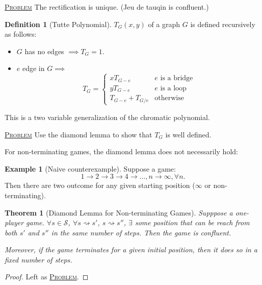 \documentclass{report}
\newcommand{\fancyem}[1]{\underline{\textsc{#1}}}
\newtheorem{theorem}{Theorem}[section]
\theoremstyle{definition}
\newtheorem{definition}{Definition}[section]
\newtheorem{example}{Example}[section]
\theoremstyle{remark}
\numberwithin{equation}{section}
\begin{document}
\fancyem{Problem} The rectification is unique. (Jeu de tauqin is confluent.)

\begin{definition}[Tutte Polynomial]
    $T_G(x, y)$ of a graph $G$ is defined recursively as follows:
    \begin{itemize}
        \item $G$ has no edges $\implies T_G = 1$.
        \item $e$ edge in $G \implies$ \[
            T_G = \begin{cases}
                xT_{G - e} & e \text{ is a bridge} \\
                yT_{G - e} & e \text{ is a loop} \\
                T_{G - e} + T_{G / e} & \text{otherwise}
            \end{cases}    
        \]
    \end{itemize}
\end{definition}
This is a two variable generalization of the chromatic polynomial.

\fancyem{Problem} Use the diamond lemma to show that $T_G$ is well defined.

For non-terminating games, the diamond lemma does not necessarily hold:
\begin{example}[Naive counterexample]
    Suppose a game:
    \[
        1 \to 2 \to 3 \to 4 \to \ldots, n \to \infty, \forall n.
    \]
    Then there are two outcome for any given starting position ($\infty$ or non-terminating).
\end{example}

\begin{theorem}[Diamond Lemma for Non-terminating Games]
    Supppose a one-player game. $\forall s \in \mathcal{S}$, $\forall s \rightsquigarrow s'$, $s \rightsquigarrow s''$, $\exists$ some position that can be reach from both $s'$ and $s''$ in the same number of steps. Then the game is confluent.

    Moreover, if the game terminates for a given initial position, then it does so in a fixed number of steps.
\end{theorem}
\begin{proof}
    Left as \fancyem{Problem}.
\end{proof}
\end{document}
